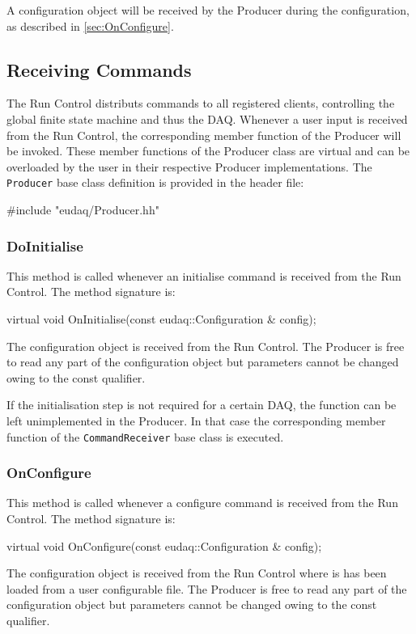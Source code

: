 A configuration object will be received by the Producer during the configuration,
as described in \autoref{sec:OnConfigure}.

\subsection{Receiving Commands}
The Run Control distributs commands to all registered clients, controlling the global finite state machine and thus the DAQ.
Whenever a user input is received from the Run Control, the corresponding member function of the Producer will be invoked.
These member functions of the Producer class are virtual and can be overloaded by the user in their respective Producer implementations.
The \texttt{Producer} base class definition is provided in the header file:
\begin{listing}
#include "eudaq/Producer.hh"
\end{listing}

\subsubsection{DoInitialise}
This method is called whenever an initialise command is received from the Run Control.
The method signature is:
\begin{listing}
virtual void OnInitialise(const eudaq::Configuration & config);
\end{listing}

The configuration object is received from the Run Control. The Producer is free to read any part of the configuration object but parameters cannot be changed owing to the const qualifier.

If the initialisation step is not required for a certain DAQ, the function can be left unimplemented in the Producer. In that case the corresponding member function of the \texttt{CommandReceiver} base class is executed.

\subsubsection{OnConfigure}\label{sec:OnConfigure}
This method is called whenever a configure command is received from the Run Control.
The method signature is:
\begin{listing}
virtual void OnConfigure(const eudaq::Configuration & config);
\end{listing}

The configuration object is received from the Run Control where is has been loaded from a user configurable file. The Producer is free to read any part of the configuration object but parameters cannot be changed owing to the const qualifier.



